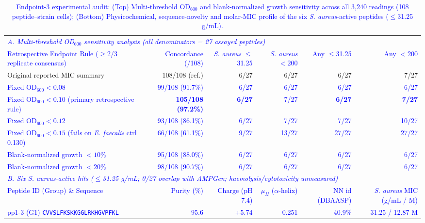 \documentclass[unnumsec,webpdf,contemporary,large]{oup-authoring-template}
\newcommand{\rev}[1]{\textcolor{blue}{#1}}
\begin{document}
\begin{table}[t]
\caption{\rev{Endpoint-3 experimental audit: (Top) Multi-threshold OD$_{600}$ and blank-normalized growth sensitivity across all 3,240 readings (108 peptide--strain cells); (Bottom) Physicochemical, sequence-novelty and molar-MIC profile of the six \textit{S. aureus}-active peptides ($\leq$31.25 \textmu{}g/mL).}}
\label{tab:wetlab_summary}
\centering
\footnotesize
\begin{tabular}{lrrrrr}
\toprule
\multicolumn{6}{l}{\textit{\rev{A. Multi-threshold OD$_{600}$ sensitivity analysis (all denominators = 27 assayed peptides)}}} \\
\rev{Retrospective Endpoint Rule ($\geq$2/3 replicate consensus)} & \rev{Concordance (/108)} & \rev{\textit{S. aureus} $\leq$31.25} & \rev{\textit{S. aureus} $<$200} & \rev{Any $\leq$31.25} & \rev{Any $<$200} \\
\midrule
Original reported MIC summary & 108/108 (ref.) & 6/27 & 6/27 & 6/27 & 7/27 \\
\rev{Fixed OD$_{600}<0.08$} & \rev{99/108 (91.7\%)} & \rev{6/27} & \rev{6/27} & \rev{6/27} & \rev{6/27} \\
\rev{Fixed OD$_{600}<0.10$ (primary retrospective rule)} & \rev{\textbf{105/108 (97.2\%)}} & \rev{\textbf{6/27}} & \rev{7/27} & \rev{\textbf{6/27}} & \rev{\textbf{7/27}} \\
\rev{Fixed OD$_{600}<0.12$} & \rev{93/108 (86.1\%)} & \rev{6/27} & \rev{7/27} & \rev{7/27} & \rev{10/27} \\
\rev{Fixed OD$_{600}<0.15$ (fails on \textit{E. faecalis} ctrl 0.130)} & \rev{66/108 (61.1\%)} & \rev{9/27} & \rev{13/27} & \rev{27/27} & \rev{27/27} \\
\rev{Blank-normalized growth $<10\%$} & \rev{95/108 (88.0\%)} & \rev{6/27} & \rev{6/27} & \rev{6/27} & \rev{6/27} \\
\rev{Blank-normalized growth $<20\%$} & \rev{98/108 (90.7\%)} & \rev{6/27} & \rev{6/27} & \rev{6/27} & \rev{6/27} \\
\midrule
\multicolumn{6}{l}{\textit{\rev{B. Six \textit{S. aureus}-active hits ($\leq$31.25 \textmu{}g/mL; 0/27 overlap with AMPGen; haemolysis/cytotoxicity unmeasured)}}} \\
\rev{Peptide ID (Group) \& Sequence} & \rev{Purity (\%)} & \rev{Charge (pH 7.4)} & \rev{$\mu_H$ ($\alpha$-helix)} & \rev{NN id (DBAASP)} & \rev{\textit{S. aureus} MIC (\textmu{}g/mL / \textmu{}M)} \\
\midrule
\rev{pp1-3 (G1) \texttt{CVVSLFKSKKGGLRKHGVPFKL}} & \rev{95.6} & \rev{+5.74} & \rev{0.251} & \rev{40.9\%} & \rev{31.25 / 12.87 \textmu{}M} \\

\end{tabular}
\end{table}
\end{document}
